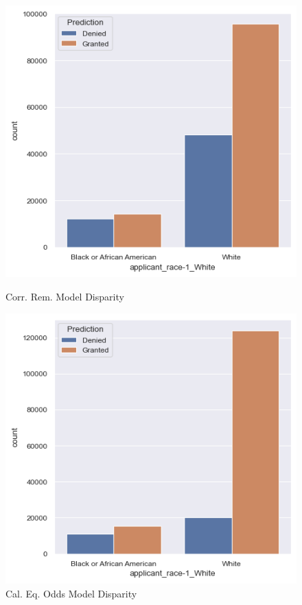 \begin{figure}[h]
    \vspace{1em} 
    
    \begin{minipage}{0.5\textwidth}
        \centering
        \includegraphics[width=\textwidth]{images/loan_grants_by_protected_attributes/correlation_removed.png}
        \caption{Corr. Rem. Model Disparity}
        \label{fig:Correlation_Removed_Disparity}
    \end{minipage}\hfill
    \begin{minipage}{0.5\textwidth}
        \centering
        \includegraphics[width=\textwidth]{images/loan_grants_by_protected_attributes/calibrated_eqodds.png} 
        \caption{Cal. Eq. Odds Model Disparity}
        \label{fig:Calibrated_EqOdds_Disparity}
    \end{minipage}
    

\end{figure}

